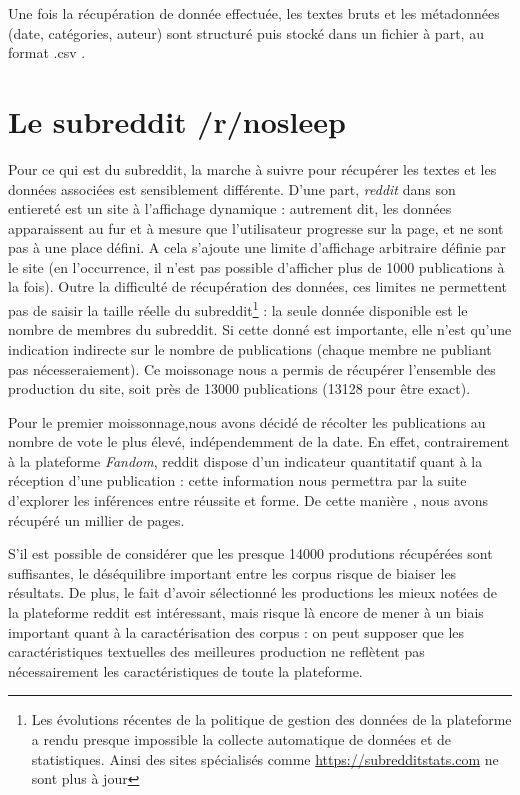 \documentclass[12pt,a4paper,oneside,titlepage]{book} %
\begin{document}
	Une fois la récupération de donnée effectuée, les textes bruts et les métadonnées (date, catégories, auteur) sont structuré puis stocké dans un fichier à part, au format .csv .
	
	\section{Le subreddit /r/nosleep}
	Pour ce qui est du subreddit, la marche à suivre pour récupérer les textes et les données associées est sensiblement différente. D'une part, \emph{reddit} dans son entiereté est un site à l'affichage dynamique : autrement dit, les données apparaissent au fur et à mesure que l'utilisateur progresse sur la page, et ne sont pas à une place défini. A cela s'ajoute une limite d'affichage arbitraire définie par le site (en l'occurrence, il n'est pas possible d'afficher plus de 1000 publications à la fois). 
	Outre la difficulté de récupération des données, ces limites ne permettent pas de saisir la taille réelle du subreddit\footnote{Les évolutions récentes de la politique de gestion des données de la plateforme a rendu presque impossible la collecte automatique de données et de statistiques. Ainsi des sites spécialisés comme \url{https://subredditstats.com} ne sont plus à jour} : la seule donnée disponible est le nombre de membres du subreddit. Si cette donné est importante, elle n'est qu'une indication indirecte sur le nombre de publications (chaque membre ne publiant pas nécesseraiement). 
	Ce moissonage nous a permis de récupérer l'ensemble des production du site, soit près de 13000 publications (13128 pour être exact).
		
	Pour le premier moissonnage,nous avons décidé de récolter les publications au nombre de vote le plus élevé, indépendemment de la date. En effet, contrairement à la plateforme \textit{Fandom}, reddit dispose d'un indicateur quantitatif quant à la réception d'une publication : cette information nous permettra par la suite d'explorer les inférences entre réussite et forme.
	De cette manière , nous avons récupéré un millier de pages. 
	
	S'il est possible de considérer que les presque 14000 produtions récupérées sont suffisantes, le déséquilibre important entre les corpus risque de biaiser les résultats. De plus, le fait d'avoir sélectionné les productions les mieux notées de la plateforme reddit est intéressant, mais risque là encore de mener à un biais important quant à la caractérisation des corpus : on peut supposer que les caractéristiques textuelles des meilleures production ne reflètent pas nécessairement les caractéristiques de toute la plateforme.
	
\end{document}
